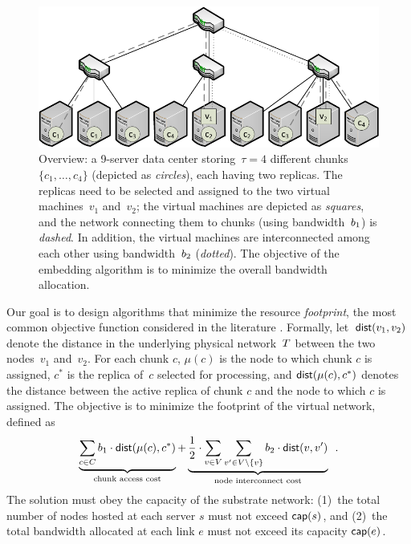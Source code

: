 \begin{figure}[t]
\centering
\includegraphics[width=0.79\columnwidth]{figs/static-mapping/data_locality_no_legend.pdf}
\caption{Overview: a 9-server data center storing~$\tau=4$ different chunks~$\{c_1,\ldots,c_4\}$ (depicted as \emph{circles}), each having two replicas. The replicas need to be selected and assigned to the two
 virtual machines~$v_1$ and~$v_2$; the virtual machines are depicted as \emph{squares}, and
 the network connecting them to chunks (using bandwidth~$b_1$) is \emph{dashed}. In addition, the virtual machines are interconnected among
 each other using bandwidth~$b_2$ (\emph{dotted}). The objective of the embedding algorithm is to minimize the overall bandwidth allocation.}\label{fig:overview}
\end{figure}


Our goal is to design algorithms that minimize the resource \emph{footprint}, the most common objective function considered in the literature \cite{fischer-survey}.
Formally, let~$\mathrm{\textsf{dist}}(v_1,v_2)$ denote the distance in the underlying physical network~$T$ between the two nodes~$v_1$ and~$v_2$.
For each chunk $c$,
$\mu(c)$ is the node to which chunk $c$ is assigned,
$c^*$ is the replica of~$c$ selected for processing,
and $\mathrm{\textsf{dist}}(\mu(c), c^*)$ denotes the distance between the active replica of chunk $c$ and the node to which $c$ is assigned.
The objective is to minimize the footprint of the virtual network, defined as
$$
\underbrace{\sum_{c \in C} b_1 \cdot \mathrm{\textsf{dist}}(\mu(c), c^*)}_{\text{chunk access cost}} +  \underbrace{\frac{1}{2} \cdot \sum_{v\in V} \sum_{v' \in V\setminus\{v\}} b_2 \cdot \mathrm{\textsf{dist}}(v,v')}_{\text{node interconnect cost}}\enspace.
$$
The solution must obey the capacity of the substrate network: (1)~the total number of nodes hosted at each server $s$ must not exceed $\textsf{cap}(s)$, and (2)~the total bandwidth allocated at each link $e$ must not exceed its capacity $\textsf{cap}(e)$.

